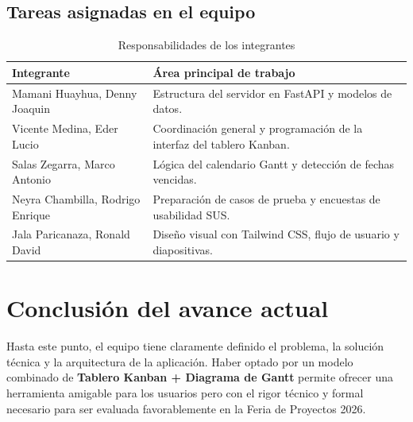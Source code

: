 \documentclass[11pt,a4paper]{article}
\begin{document}
\subsection{Tareas asignadas en el equipo}
\begin{table}[htbp]
\centering
\caption{Responsabilidades de los integrantes}
\begin{tabularx}{\textwidth}{l X}
\toprule
\textbf{Integrante} & \textbf{Área principal de trabajo} \\
\midrule
Mamani Huayhua, Denny Joaquin & Estructura del servidor en FastAPI y modelos de datos. \\
Vicente Medina, Eder Lucio & Coordinación general y programación de la interfaz del tablero Kanban. \\
Salas Zegarra, Marco Antonio & Lógica del calendario Gantt y detección de fechas vencidas. \\
Neyra Chambilla, Rodrigo Enrique & Preparación de casos de prueba y encuestas de usabilidad SUS. \\
Jala Paricanaza, Ronald David & Diseño visual con Tailwind CSS, flujo de usuario y diapositivas. \\
\bottomrule
\end{tabularx}
\end{table}

\section{Conclusión del avance actual}
Hasta este punto, el equipo tiene claramente definido el problema, la solución técnica y la arquitectura de la aplicación. Haber optado por un modelo combinado de \textbf{Tablero Kanban + Diagrama de Gantt} permite ofrecer una herramienta amigable para los usuarios pero con el rigor técnico y formal necesario para ser evaluada favorablemente en la Feria de Proyectos 2026.
\end{document}
